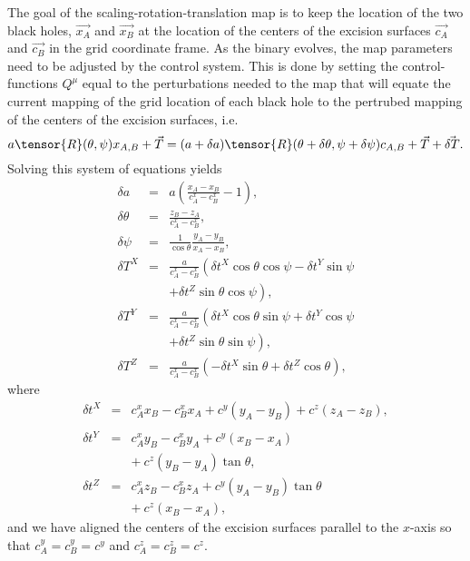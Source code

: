 \documentclass[aps, prd, amsmath, floats, floatfix, twocolumn,superscriptaddress, nofootinbib, showpacs]{revtex4-1}
\theoremstyle{plain}
\theoremstyle{definition}
\begin{document}
The goal of the scaling-rotation-translation map is to keep the
location of the two black holes, $\vec{x_A}$ and $\vec{x_B}$ at the
location of the centers of the excision surfaces $\vec{c_A}$ and
$\vec{c_B}$ in the grid coordinate frame.  As the binary evolves, the
map parameters need to be adjusted by the control system.  This is done by setting the control-functions $Q^\mu$ equal to the perturbations needed to the map that will equate the current mapping of the grid location of each black hole to the pertrubed mapping of the centers of the excision surfaces, i.e.
\begin{equation}
a \tensor{R}(\theta,\psi) x_{A,B} + \vec{T} = 
(a + \delta a) \tensor{R}(\theta + \delta\theta,\psi+\delta\psi) c_{A,B} + 
\vec{T} + \vec{\delta T}.
\end{equation}
Solving this system of equations yields
\begin{eqnarray}
\delta a &=& a \left( \frac{x_A - x_B}{c^x_A - c^x_B} - 1 \right), \\
\delta \theta &=& \frac{z_B - z_A}{c^x_A - c^x_B},\\
\delta \psi &=& \frac{1}{\cos{\theta}} \frac{y_A - y_B}{x_A - x_B}, \\
\delta T^X &=& \frac{a}{c^x_A - c^x_B} \left( 
   \delta t^X \cos{\theta} \cos{\psi} - \delta t^Y \sin{\psi} \right. 
\nonumber \\ && + \left. 
   \delta t^Z \sin{\theta} \cos{\psi} \right),\\
\delta T^Y &=& \frac{a}{c^x_A - c^x_B} \left( 
   \delta t^X \cos{\theta} \sin{\psi} + \delta t^Y \cos{\psi} \right. 
\nonumber \\ && + \left. 
   \delta t^Z \sin{\theta} \sin{\psi} \right),\\
\delta T^Z &=& \frac{a}{c^x_A - c^x_B} \left( - \delta t^X \sin{\theta} +
                                              \delta t^Z \cos{\theta} \right),
\end{eqnarray}
where
\begin{eqnarray}
\delta t^X &=& c^x_A x_B - c^x_B x_A + c^y \left( y_A - y_B \right) + 
               c^z \left( z_A - z_B \right), \nonumber \\ && \\
\delta t^Y &=& c^x_A y_B - c^x_B y_A + c^y \left( x_B - x_A \right) \nonumber 
\\ && + ~ c^z \left( y_B - y_A \right) \tan{\theta},\\
\delta t^Z &=& c^x_A z_B - c^x_B z_A + c^y \left( y_A - y_B \right) 
               \tan{\theta} \nonumber \\ && + ~ c^z \left( x_B - x_A \right),
\end{eqnarray}
and we have aligned the centers of the excision surfaces parallel to
the $x$-axis so that $c_A^y = c_B^y = c^y$ and $c_A^z = c_B^z = c^z$.
\end{document}
